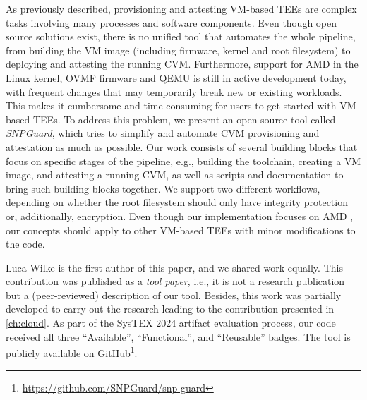 As previously described, provisioning and attesting \acs{VM}-based \acp{TEE} are
complex tasks involving many processes and software components. Even though open
source solutions exist, there is no unified tool that automates the whole
pipeline, from building the \ac{VM} image (including firmware, kernel and root
filesystem) to deploying and attesting the running \ac{CVM}. Furthermore,
support for AMD \sevsnp{} in the Linux kernel, \ac{OVMF} firmware and QEMU is
still in active development today, with frequent changes that may temporarily
break new or existing workloads. This makes it cumbersome and time-consuming for
users to get started with \acs{VM}-based \acp{TEE}. To address this problem, we
present an open source tool called \emph{SNPGuard}, which tries to simplify and
automate \ac{CVM} provisioning and attestation as much as possible. Our work
consists of several building blocks that focus on specific stages of the
pipeline, e.g., building the \sevsnp{} toolchain, creating a \ac{VM} image, and
attesting a running \ac{CVM}, as well as scripts and documentation to bring such
building blocks together. We support two different workflows, depending on
whether the root filesystem should only have integrity protection or,
additionally, encryption. Even though our implementation focuses on AMD
\sevsnp{}, our concepts should apply to other \acs{VM}-based \acp{TEE} with
minor modifications to the code.

Luca Wilke is the first author of this paper, and we shared work equally. This
contribution was published as a \emph{tool paper}, i.e., it is not a research
publication but a (peer-reviewed) description of our tool. Besides, this work
was partially developed to carry out the research leading to the contribution
presented in \cref{ch:cloud}. As part of the SysTEX 2024 artifact evaluation
process, our code received all three ``Available'', ``Functional'', and
``Reusable'' badges. The tool is publicly available on
GitHub\footnote{\url{https://github.com/SNPGuard/snp-guard}}.

\begin{formal}
    \papersnprefr{}
\end{formal}
